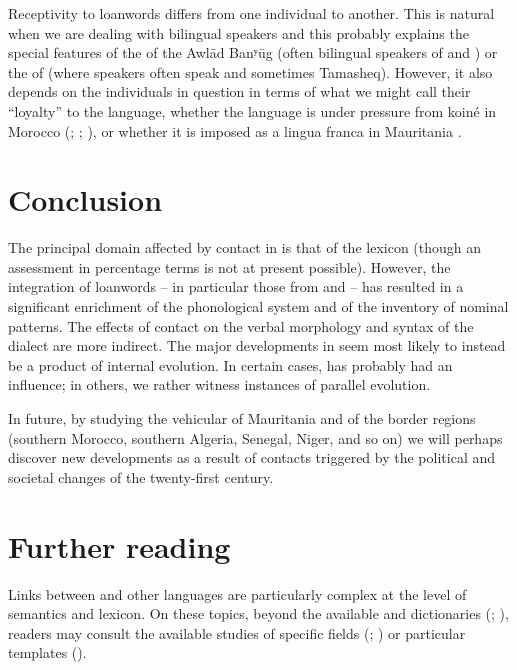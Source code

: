 \documentclass[output=paper]{langsci/langscibook}
\begin{document}

Receptivity to {loanwords} differs from one individual to another. This is natural when we are dealing with bilingual speakers and this probably explains the special features of the  of the Awlād Banʸūg (often bilingual speakers of  and ) or the  of  (where  speakers often speak  and sometimes Tamasheq). However, it also depends on the individuals in question in terms of what we might call their “loyalty” to the language, whether the language is under pressure from   koiné in Morocco (\citealt{Taine-Cheikh1997socio}; \citealt{Heath2002}; \citealt{Paciotti2017}), or whether it is imposed as a lingua franca in Mauritania \citep{Dia2007}.

\section{Conclusion} %

The principal domain affected by contact in  is that of the lexicon (though an assessment in percentage terms is not at present possible). However, the integration of {loanwords} – in particular those from   and  – has resulted in a significant enrichment of the phonological system and of the inventory of nominal patterns. The effects of contact on the verbal morphology and syntax of the dialect are more indirect. The major developments in  seem most likely to instead be a product of internal evolution. In certain cases,  has probably had an influence; in others, we rather witness instances of parallel evolution. 

In {future}, by studying the vehicular  of Mauritania and of the border regions (southern Morocco, southern Algeria, Senegal, Niger, and so on) we will perhaps discover new developments as a result of contacts triggered by the political and societal changes of the twenty-first century. 

\section*{Further reading}

Links between  and other languages are particularly complex at the level of semantics and lexicon. On these topics, beyond the available  and  dictionaries (\citealt{Heath2004}; \citealt{Taine-Cheikh1988dictionary,Taine-Cheikh2008dictionary}), readers may consult the available studies of specific fields (\citealt{Monteil1952}; \citealt{Taine-Cheikh2013}) or particular templates (\citealt{Taine-Cheikh2018quadri}).
\end{document}
